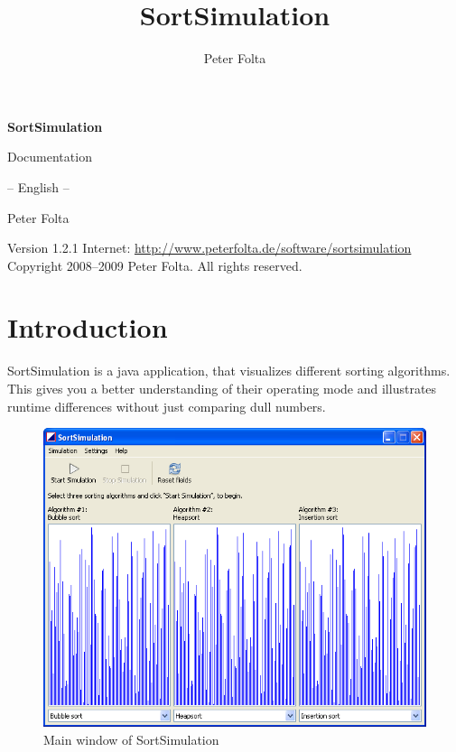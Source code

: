 \documentclass[11pt, a4paper, titlepage, twoside]{article}
\title{SortSimulation}
\author{Peter Folta}
\newcommand{\version}{1.2.1}
\begin{document}
	
	\begin{titlepage}
		\begin{center}
			\vspace*{2.5cm}
			\Huge{\textbf{SortSimulation}}
			
			\vspace*{1.5cm}
			\LARGE{Documentation}
			
			\Large{-- English --}
			
			\vspace*{3.75cm}
			\Large{Peter Folta}
		\end{center}
		
		\vspace*{8cm}
		\noindent{}Version \version\newline{}
		Internet: \href{http://www.peterfolta.de/software/sortsimulation}{http://www.peterfolta.de/software/sortsimulation}\newline{}
		Copyright \textcopyright{} 2008--2009 Peter Folta. All rights reserved.
	\end{titlepage}
	
	\setcounter{page}{2}
	
	\cleardoublepage{}
	\tableofcontents{}
	\newpage{}
	
	
	\section{Introduction}
	
	SortSimulation is a java application, that visualizes different sorting algorithms. This gives you a better understanding of their operating mode and illustrates runtime differences without just comparing dull numbers.
	
	\begin{figure}[h]
		\begin{center}
			\includegraphics[scale=0.6]{images/image0.png}
			\caption{Main window of SortSimulation}
		\end{center}
	\end{figure}
	
\end{document}
